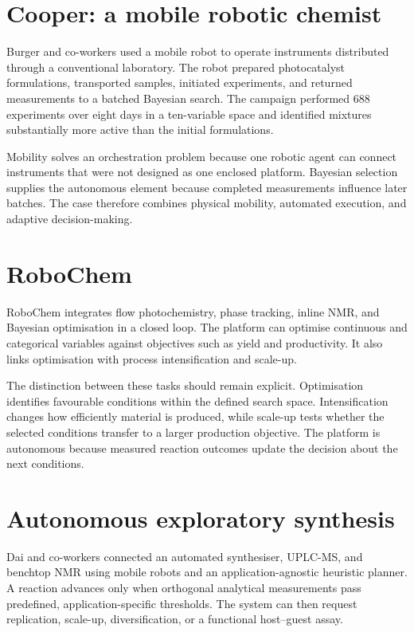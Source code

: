 \section{Cooper: a mobile robotic chemist}

Burger and co-workers used a mobile robot to operate instruments distributed through a conventional laboratory.
The robot prepared photocatalyst formulations, transported samples, initiated experiments, and returned measurements to a batched Bayesian search.
The campaign performed 688 experiments over eight days in a ten-variable space and identified mixtures substantially more active than the initial formulations.

Mobility solves an orchestration problem because one robotic agent can connect instruments that were not designed as one enclosed platform.
Bayesian selection supplies the autonomous element because completed measurements influence later batches.
The case therefore combines physical mobility, automated execution, and adaptive decision-making.

\section{RoboChem}

RoboChem integrates flow photochemistry, phase tracking, inline NMR, and Bayesian optimisation in a closed loop.
The platform can optimise continuous and categorical variables against objectives such as yield and productivity.
It also links optimisation with process intensification and scale-up.

The distinction between these tasks should remain explicit.
Optimisation identifies favourable conditions within the defined search space.
Intensification changes how efficiently material is produced, while scale-up tests whether the selected conditions transfer to a larger production objective.
The platform is autonomous because measured reaction outcomes update the decision about the next conditions.

\section{Autonomous exploratory synthesis}

Dai and co-workers connected an automated synthesiser, UPLC-MS, and benchtop NMR using mobile robots and an application-agnostic heuristic planner.
A reaction advances only when orthogonal analytical measurements pass predefined, application-specific thresholds.
The system can then request replication, scale-up, diversification, or a functional host--guest assay.

